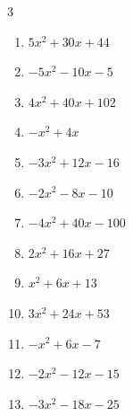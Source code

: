\begin{multicols}{3}
\begin{enumerate}
  \item $5x^{2}+30x+44$


  \item $-5x^{2}-10x-5$


  \item $4x^{2}+40x+102$


  \item $-x^{2}+4x$


  \item $-3x^{2}+12x-16$


  \item $-2x^{2}-8x-10$


  \item $-4x^{2}+40x-100$


  \item $2x^{2}+16x+27$


  \item $x^{2}+6x+13$


\columnbreak %

\resetques

  \item $3x^{2}+24x+53$


  \item $-x^{2}+6x-7$


  \item $-2x^{2}-12x-15$


  \item $-3x^{2}-18x-25$



\end{enumerate}
\end{multicols}
